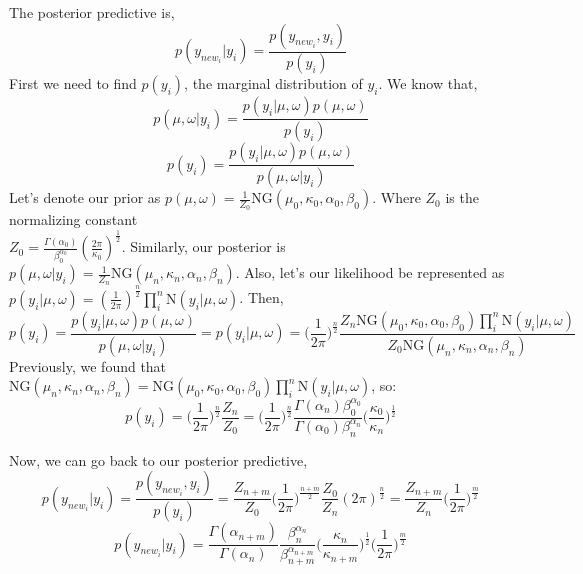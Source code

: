 \documentclass[twoside]{article}
\begin{document}
The posterior predictive is,
$$ p(y_{new_i}|y_i) = \frac{p(y_{new_i},y_i)}{p(y_i)}$$
First we need to find $p(y_i)$, the marginal distribution of $y_i$. We know that,
$$ p(\mu, \omega|y_i) = \frac{p(y_i|\mu, \omega) p(\mu, \omega)}{p(y_i)} $$
$$p(y_i) = \frac{p(y_i|\mu, \omega)p(\mu, \omega)}{p(\mu, \omega |y_i)}$$
Let's denote our prior as 
$p(\mu, \omega) = \frac{1}{Z_0}
\mbox{NG}(\mu_0, \kappa_0, \alpha_0, \beta_0  )$. 
Where $Z_0$ is the normalizing constant \\
$Z_0 = \frac{\Gamma(\alpha_0)}{\beta_0^{\alpha_0}} (\frac{2 \pi}{ \kappa_0} )^{\frac{1}{2}}  $. 
Similarly, our posterior is $p(\mu, \omega |y_i) = \frac{1}{Z_n}\mbox{NG}(\mu_n, \kappa_n, \alpha_n, \beta_n  )$. 
Also, let's our likelihood be represented as $  p(y_i|\mu, \omega) = (\frac{1}{ 2 \pi} )^{\frac{n}{2}}  \prod_{i}^n\mbox{N}(y_i|\mu, \omega) $. Then,
$$p(y_i) = \frac{p(y_i|\mu, \omega)p(\mu, \omega)}{p(\mu, \omega |y_i)}
=   p(y_i|\mu, \omega) = \bigg(\frac{1}{ 2 \pi} \bigg)^{\frac{n}{2}} 
\frac{Z_n\mbox{NG}(\mu_0, \kappa_0, \alpha_0, \beta_0  )\prod_{i}^n\mbox{N}(y_i|\mu, \omega)}{Z_0\mbox{NG}(\mu_n, \kappa_n, \alpha_n, \beta_n  )} $$
Previously, we found that $ \mbox{NG}(\mu_n, \kappa_n, \alpha_n, \beta_n  ) = \mbox{NG}(\mu_0, \kappa_0, \alpha_0, \beta_0  )\prod_{i}^n\mbox{N}(y_i|\mu, \omega)$, so:
$$p(y_i) =  \bigg(\frac{1}{ 2 \pi} \bigg)^{\frac{n}{2}} 
\frac{Z_n}{Z_0} = \bigg(\frac{1}{ 2 \pi} \bigg)^{\frac{n}{2}} 
\frac{\Gamma(\alpha_n)\beta_0^{\alpha_0}}{\Gamma(\alpha_0)\beta_n^{\alpha_n}} \bigg(\frac{\kappa_0}{ \kappa_n} \bigg)^{\frac{1}{2}}$$

Now, we can go back to our posterior predictive,
$$ p(y_{new_i}|y_i) = \frac{p(y_{new_i},y_i)}{p(y_i)}=
\frac{Z_{n+m}}{Z_0}\bigg(\frac{1}{ 2 \pi} \bigg)^{\frac{n+m}{2}} 
\frac{Z_0}{Z_n} (2\pi)^{\frac{n}{2}} =
\frac{Z_{n+m}}{Z_n}\bigg(\frac{1}{ 2 \pi} \bigg)^{\frac{m}{2}} $$
$$ p(y_{new_i}|y_i) = 
\frac{\Gamma(\alpha_{n+m})}{\Gamma(\alpha_n)}
\frac{\beta_n^{\alpha_n}}{\beta_{n+m}^{\alpha_{n+m}}}
\bigg(\frac{\kappa_n}{ \kappa_{n+m}} \bigg)^{\frac{1}{2}} 
\bigg(\frac{1}{ 2 \pi} \bigg)^{\frac{m}{2}} 
$$
\end{document}
